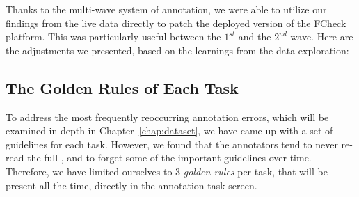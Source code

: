  Thanks to the multi-wave system of annotation, we were able to utilize our findings from the live data directly to patch the deployed version of the \textsf{FCheck} platform. This was particularly useful between the $1^{st}$ and the $2^{nd}$ wave. Here are the adjustments we presented, based on the learnings from the data exploration:


\subsection{The Golden Rules of Each Task}
\label{sec:golden-rules}
To address the most frequently reoccurring annotation errors, which will be examined in depth in Chapter~\ref{chap:dataset}, we have came up with a set of guidelines for each task. However, we found that the annotators tend to never re-read the full , and to forget some of the important guidelines over time. Therefore, we have limited ourselves to 3 \textit{golden rules} per task, that will be present all the time, directly in the annotation task screen.


